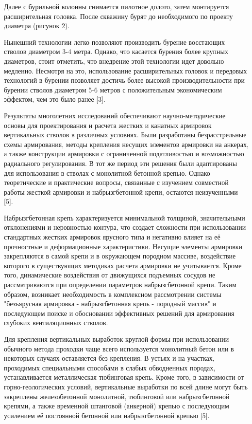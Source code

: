 \begin{multicols}{2}
Далее с бурильной колонны снимается пилотное долото, затем монтируется
расширительная головка. После скважину бурят до необходимого по проекту
диаметра (рисунок 2).

Нынешний технологии легко позволяют производить бурение восстающих
стволов диаметром 3-4 метра. Однако, что касается бурения более крупных
диаметров, стоит отметить, что внедрение этой технологии идет довольно
медленно. Несмотря на это, использование расширительных головок и
передовых технологий в бурении позволяет достичь более высокой
производительности при бурении стволов диаметром 5-6 метров с
положительным экономическим эффектом, чем это было ранее {[}3{]}.

Результаты многолетних исследований обеспечивают научно-методические
основы для проектирования и расчета жестких и канатных армировок
вертикальных стволов в различных условиях. Были разработаны
безрасстрельные схемы армирования, методы крепления несущих элементов
армировки на анкерах, а также конструкции армировки с ограниченной
податливостью и возможностью радиального регулирования. В тот же период
эти решения были адаптированы для использования в стволах с монолитной
бетонной крепью. Однако теоретические и практические вопросы, связанные
с изучением совместной работы жесткой армировки и набрызгбетонной крепи,
остаются неизученными {[}5{]}.

Набрызгбетонная крепь характеризуется минимальной толщиной,
значительными отклонениями и неровностью контура, что создает сложности
при использовании стандартных жестких армировок ярусного типа и
негативно влияет на её прочностные и деформационные характеристики.
Несущие элементы армировки закрепляются в самой крепи и в окружающем
породном массиве, воздействие которого в существующих методиках расчета
армировки не учитывается. Кроме того, динамические воздействия от
движущихся подъемных сосудов не рассматриваются при определении
параметров набрызгбетонной крепи. Таким образом, возникает необходимость
в комплексном рассмотрении системы "безъярусная армировка -
набрызгбетонная крепь - породный массив" и последующем поиске и
обосновании эффективных решений для армирования глубоких вентиляционных
стволов.

Для крепления вертикальных выработок круглой формы при использовании
обычного метода проходки чаще всего используется монолитный бетон или в
некоторых случаях оставляется без крепления. В устьях и на участках,
проходимых специальными способами в слабых обводненных породах,
устанавливается металлическая тюбинговая крепь. Кроме того, в
зависимости от горно-геологических условий, вертикальные выработки по
всей длине могут быть закреплены железобетонной монолитной, тюбинговой
или набрызгбетонной крепями, а также временной штанговой (анкерной)
крепью с последующим усилением её постоянной бетонной или
набрызгбетонной крепью {[}5{]}.


\end{multicols}
